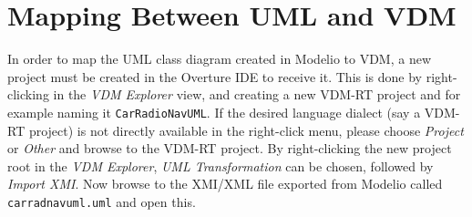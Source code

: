 \section{Mapping Between UML and  VDM}\label{sec:fromUMLtoVDM}\label{sec:syntaxcheck}
\label{sec:typecheck}

In order to map the UML class diagram created in Modelio
to VDM, a new project must be created in the Overture IDE to receive
it. This is done by right-clicking in the \emph{VDM Explorer} view,
and creating a new VDM-RT project and for example naming it
\texttt{CarRadioNavUML}. If the desired language dialect (say a VDM-RT 
project) is not directly available in the right-click menu, please choose
\emph{Project} or 
\emph{Other} and browse to the VDM-RT project. By right-clicking the new 
project root in the \emph{VDM Explorer}, \emph{UML Transformation} can 
be chosen, followed by \emph{Import XMI}. Now browse to the XMI/XML file
exported from Modelio called \texttt{carradnavuml.uml} and open this.






